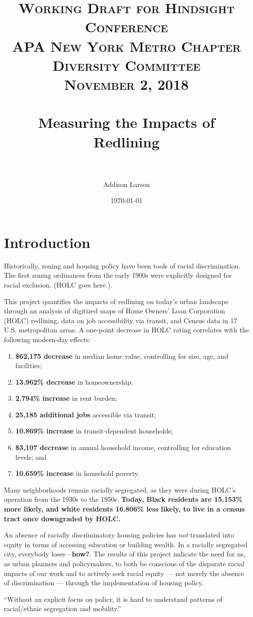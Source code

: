 \documentclass[paper=letter, fontsize=12pt]{scrartcl} %
\title{	
\normalfont \normalsize 
\textsc{Working Draft for Hindsight Conference\\APA New York Metro Chapter Diversity Committee\\November 2, 2018} \\ [6pt] %
\horrule{1pt} \\[0.5cm] %
\huge Measuring the Impacts of Redlining\\%
\horrule{1pt}\\[0.5cm] %
}
\author{Addison Larson} %
\date{\normalsize{\today}} %
\begin{document}
\maketitle %
\newpage
\tableofcontents
\newcommand{\blankpage}{
	\newpage
	\mbox{}
	\newpage
}
\listoftables
\listoffigures
\blankpage
\section{Introduction}
Historically, zoning and housing policy have been tools of racial discrimination. The first zoning ordinances from the early 1900s were explicitly designed for racial exclusion. (HOLC goes here.)\cite{rothstein}.\par
This project quantifies the impacts of redlining on today's urban landscape through an analysis of digitized maps of Home Owners' Loan Corporation (HOLC) redlining, data on job accessibility via transit, and Census data in 17 U.S. metropolitan areas. A one-point decrease in HOLC rating correlates with the following modern-day effects: 
\begin{enumerate}
	\item \textbf{\$62,175 decrease} in median home value, controlling for size, age, and facilities;
	\item \textbf{13.962\% decrease} in homeownership;
	\item \textbf{2.794\% increase} in rent burden;
	\item \textbf{25,185 additional jobs} accessible via transit;
	\item \textbf{10.869\% increase} in transit-dependent households;
	\item \textbf{\$3,107 decrease} in annual household income, controlling for education levels; and
	\item \textbf{10.659\% increase} in household poverty.
\end{enumerate}
Many neighborhoods remain racially segregated, as they were during HOLC's operation from the 1930s to the 1950s. \textbf{Today, Black residents are 15.153\% more likely, and white residents 16.806\% less likely, to live in a census tract once downgraded by HOLC.}

An absence of racially discriminatory housing policies has \textit{not} translated into equity in terms of accessing education or building wealth. In a racially segregated city, everybody loses---\textbf{how?}. The results of this project indicate the need for us, as urban planners and policymakers, to both be conscious of the disparate racial impacts of our work and to actively seek racial equity --- not merely the absence of discrimination --- through the implementation of housing policy.\par
``Without an explicit focus on policy, it is hard to understand patterns of racial/ethnic segregation and mobility.'' \cite{squires}
\end{document}

